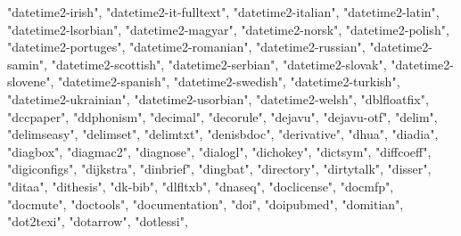\documentclass[
]{article}
\newenvironment{Shaded}{\begin{snugshade}}{\end{snugshade}}
\newcommand{\NormalTok}[1]{#1}
\newcommand{\StringTok}[1]{\textcolor[rgb]{0.31,0.60,0.02}{#1}}
\begin{document}
\begin{Shaded}
\begin{Highlighting}[]
\StringTok{"datetime2{-}irish"}\NormalTok{, }\StringTok{"datetime2{-}it{-}fulltext"}\NormalTok{, }\StringTok{"datetime2{-}italian"}\NormalTok{, }
\StringTok{"datetime2{-}latin"}\NormalTok{, }\StringTok{"datetime2{-}lsorbian"}\NormalTok{, }\StringTok{"datetime2{-}magyar"}\NormalTok{, }
\StringTok{"datetime2{-}norsk"}\NormalTok{, }\StringTok{"datetime2{-}polish"}\NormalTok{, }\StringTok{"datetime2{-}portuges"}\NormalTok{, }
\StringTok{"datetime2{-}romanian"}\NormalTok{, }\StringTok{"datetime2{-}russian"}\NormalTok{, }\StringTok{"datetime2{-}samin"}\NormalTok{, }
\StringTok{"datetime2{-}scottish"}\NormalTok{, }\StringTok{"datetime2{-}serbian"}\NormalTok{, }\StringTok{"datetime2{-}slovak"}\NormalTok{, }
\StringTok{"datetime2{-}slovene"}\NormalTok{, }\StringTok{"datetime2{-}spanish"}\NormalTok{, }\StringTok{"datetime2{-}swedish"}\NormalTok{, }
\StringTok{"datetime2{-}turkish"}\NormalTok{, }\StringTok{"datetime2{-}ukrainian"}\NormalTok{, }\StringTok{"datetime2{-}usorbian"}\NormalTok{, }
\StringTok{"datetime2{-}welsh"}\NormalTok{, }\StringTok{"dblfloatfix"}\NormalTok{, }\StringTok{"dccpaper"}\NormalTok{, }\StringTok{"ddphonism"}\NormalTok{, }\StringTok{"decimal"}\NormalTok{, }
\StringTok{"decorule"}\NormalTok{, }\StringTok{"dejavu"}\NormalTok{, }\StringTok{"dejavu{-}otf"}\NormalTok{, }\StringTok{"delim"}\NormalTok{, }\StringTok{"delimseasy"}\NormalTok{, }\StringTok{"delimset"}\NormalTok{, }
\StringTok{"delimtxt"}\NormalTok{, }\StringTok{"denisbdoc"}\NormalTok{, }\StringTok{"derivative"}\NormalTok{, }\StringTok{"dhua"}\NormalTok{, }\StringTok{"diadia"}\NormalTok{, }\StringTok{"diagbox"}\NormalTok{, }
\StringTok{"diagmac2"}\NormalTok{, }\StringTok{"diagnose"}\NormalTok{, }\StringTok{"dialogl"}\NormalTok{, }\StringTok{"dichokey"}\NormalTok{, }\StringTok{"dictsym"}\NormalTok{, }\StringTok{"diffcoeff"}\NormalTok{, }
\StringTok{"digiconfigs"}\NormalTok{, }\StringTok{"dijkstra"}\NormalTok{, }\StringTok{"dinbrief"}\NormalTok{, }\StringTok{"dingbat"}\NormalTok{, }\StringTok{"directory"}\NormalTok{, }
\StringTok{"dirtytalk"}\NormalTok{, }\StringTok{"disser"}\NormalTok{, }\StringTok{"ditaa"}\NormalTok{, }\StringTok{"dithesis"}\NormalTok{, }\StringTok{"dk{-}bib"}\NormalTok{, }\StringTok{"dlfltxb"}\NormalTok{, }
\StringTok{"dnaseq"}\NormalTok{, }\StringTok{"doclicense"}\NormalTok{, }\StringTok{"docmfp"}\NormalTok{, }\StringTok{"docmute"}\NormalTok{, }\StringTok{"doctools"}\NormalTok{, }\StringTok{"documentation"}\NormalTok{, }
\StringTok{"doi"}\NormalTok{, }\StringTok{"doipubmed"}\NormalTok{, }\StringTok{"domitian"}\NormalTok{, }\StringTok{"dot2texi"}\NormalTok{, }\StringTok{"dotarrow"}\NormalTok{, }\StringTok{"dotlessi"}\NormalTok{, }

\end{Highlighting}
\end{Shaded}
\end{document}
